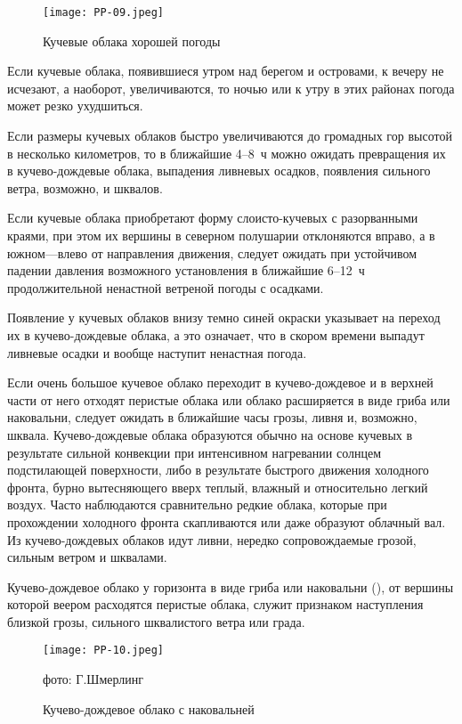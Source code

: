 \begin{figure}[htb]
  \centering{}
  \texttt{[image: PP-09.jpeg]}
  \caption{Кучевые облака хорошей погоды}
  \label{fig:pp09}
  \small
  \centering{}
\end{figure}

 Если кучевые облака, появившиеся утром над берегом и островами,
к вечеру не исчезают, а наоборот, увеличиваются, то ночью или к утру в
этих районах погода может резко ухудшиться.

 Если размеры кучевых облаков быстро увеличиваются до громадных
гор высотой в несколько километров, то в ближайшие 4--8~ч можно ожидать
превращения их в кучево-дождевые облака, выпадения ливневых осадков,
появления сильного ветра, возможно, и шквалов.

 Если кучевые облака приобретают форму слоисто-кучевых с
разорванными краями, при этом их вершины в северном полушарии
отклоняются вправо, а в южном—влево от направления движения, следует
ожидать при устойчивом падении давления возможного установления в
ближайшие 6--12~ч продолжительной ненастной ветреной погоды с
осадками.

 Появление у кучевых облаков внизу темно синей окраски указывает
на переход их в кучево-дождевые облака, а это означает, что в скором
времени выпадут ливневые осадки и вообще наступит ненастная погода.

 Если очень большое кучевое облако переходит в кучево-дождевое и
в верхней части от него отходят перистые облака или облако расширяется
в виде гриба или наковальни, следует ожидать в ближайшие часы грозы,
ливня и, возможно, шквала. Кучево-дождевые облака образуются обычно на
основе кучевых в результате сильной конвекции при интенсивном
нагревании солнцем подстилающей поверхности, либо в результате
быстрого движения холодного фронта, бурно вытесняющего вверх теплый,
влажный и относительно легкий воздух. Часто наблюдаются сравнительно
редкие облака, которые при прохождении холодного фронта скапливаются
или даже образуют облачный вал. Из кучево-дождевых облаков идут ливни,
нередко сопровождаемые грозой, сильным ветром и шквалами.

 Кучево-дождевое облако у горизонта в виде гриба или наковальни
(), от вершины которой веером расходятся перистые облака,
служит признаком наступления близкой грозы, сильного шквалистого ветра
или града.

\begin{figure}[htb]
  \centering{}
  \texttt{[image: PP-10.jpeg]}
  \caption{Кучево-дождевое облако с наковальней}
  \label{fig:pp10}
  \small
  \centering{}фото: Г.Шмерлинг
\end{figure}


